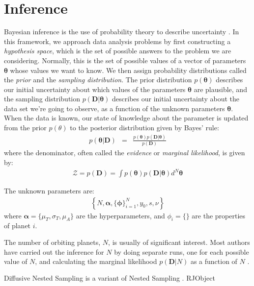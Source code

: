 \documentclass[useAMS,usenatbib]{mn2e}
\renewcommand{\btheta}{\boldsymbol{\theta}}
\newcommand{\bdata}{\boldsymbol{D}}
\begin{document}
\section{Inference}
Bayesian inference is the use of probability theory to describe uncertainty
\citep{sivia, ohagan}. In this framework, we approach data analysis problems by first
constructing a {\it hypothesis space}, which is the set of possible answers
to the problem we are considering. Normally, this is the set of possible
values of a vector of parameters $\btheta$ whose values we want
to know. We then assign probability distributions
called the {\it prior} and the {\it sampling distribution}. The prior
distribution $p(\btheta)$ describes
our initial uncertainty about which values of the parameters
$\btheta$ are plausible, and the
sampling distribution $p(\bdata | \btheta)$ describes
our initial uncertainty about the data set we're going to observe, as a
function of the unknown parameters $\btheta$.
When the data is known, our state of knowledge about the parameter is
updated from the prior $p(\theta)$ to the posterior distribution given by
Bayes' rule:
\begin{eqnarray}
p(\btheta | \bdata) &=&
\frac{p(\btheta)p(\bdata | \btheta)}
{p(\bdata)}
\end{eqnarray}
where the denominator, often called the {\it evidence} or
{\it marginal likelihood}, is given by:
\begin{eqnarray}
\mathcal{Z} = p(\bdata) = \int p(\btheta) p(\bdata | \btheta) d^N \btheta
\end{eqnarray}

The unknown parameters are:
\begin{eqnarray}
\left\{N, \boldsymbol{\alpha}, \{\boldsymbol{\phi}\}_{i=1}^N, y_0, s, \nu\right\}
\end{eqnarray}
where $\boldsymbol{\alpha} = \{\mu_T, \sigma_T, \mu_A\}$ are the
hyperparameters, and $\phi_i = \{\}$ are the properties of planet $i$.

The number of orbiting planets, $N$, is usually of significant interest.
Most authors have carried out the inference for $N$ by doing separate runs, one
for each possible value of $N$, and calculating the marginal likelihood
$p(\bdata | N)$ as a function of $N$
\citep[e.g.][]{2011MNRAS.415.2523G, 2014MNRAS.437.3540F, fengji}.

Diffusive Nested Sampling \citep{dnest} is a variant of
Nested Sampling \citep{skilling}. RJObject \citep{rjobject}
\end{document}
